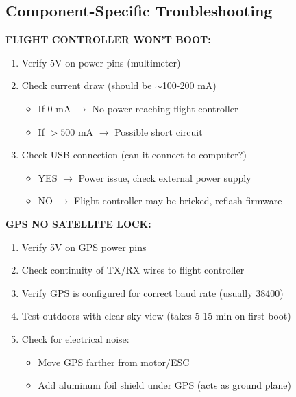 \documentclass[11pt,letterpaper]{article}
\begin{document}
\subsection{Component-Specific Troubleshooting}

\textbf{FLIGHT CONTROLLER WON'T BOOT:}
\begin{enumerate}
\item Verify 5V on power pins (multimeter)
\item Check current draw (should be $\sim$100-200 mA)
\begin{itemize}[nosep]
\item If 0 mA $\rightarrow$ No power reaching flight controller
\item If $> 500$ mA $\rightarrow$ Possible short circuit
\end{itemize}
\item Check USB connection (can it connect to computer?)
\begin{itemize}[nosep]
\item YES $\rightarrow$ Power issue, check external power supply
\item NO $\rightarrow$ Flight controller may be bricked, reflash firmware
\end{itemize}
\end{enumerate}

\textbf{GPS NO SATELLITE LOCK:}
\begin{enumerate}
\item Verify 5V on GPS power pins
\item Check continuity of TX/RX wires to flight controller
\item Verify GPS is configured for correct baud rate (usually 38400)
\item Test outdoors with clear sky view (takes 5-15 min on first boot)
\item Check for electrical noise:
\begin{itemize}[nosep]
\item Move GPS farther from motor/ESC
\item Add aluminum foil shield under GPS (acts as ground plane)
\end{itemize}
\end{enumerate}
\end{document}
